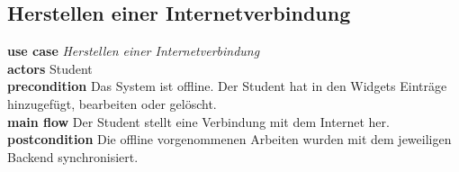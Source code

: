 \subsection{Herstellen einer Internetverbindung}
\textbf{use case} \emph{Herstellen einer Internetverbindung}\\
\textbf{actors} Student\\
\textbf{precondition} Das System ist offline. Der Student hat in den Widgets Einträge hinzugefügt, bearbeiten oder gelöscht.\\
\textbf{main flow} Der Student stellt eine Verbindung mit dem Internet her.\\
\textbf{postcondition} Die offline vorgenommenen Arbeiten wurden mit dem jeweiligen Backend synchronisiert.
